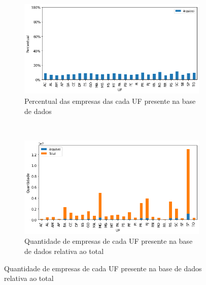 \begin{figure}[htb]
    \centering
    \caption{Participação por UF das empresas presentes na base de dados}
    \label{fig:base-de-dados:descritiva-2-presenca-por-uf}
    \begin{subfigure}[b]{1.00\textwidth} 
        \includegraphics[scale=0.7]{images/base-de-dados-2.1-presenca-por-uf.png}
        \caption{Percentual das empresas das cada UF presente na base de dados}
        \label{fig:base-de-dados:descritiva-2.1-presenca-por-uf}
    \end{subfigure} ~ \\
    \begin{subfigure}[b]{1.00\textwidth}
        \includegraphics[scale=0.7]{images/base-de-dados-2.2-qtde-por-uf.png}
        \caption{Quantidade de empresas de cada UF presente na base de dados relativa ao total}
        \label{fig:base-de-dados:descritiva-2.2-qtde-por-uf}
    \end{subfigure}
    \fdadospesquisa
\end{figure}

